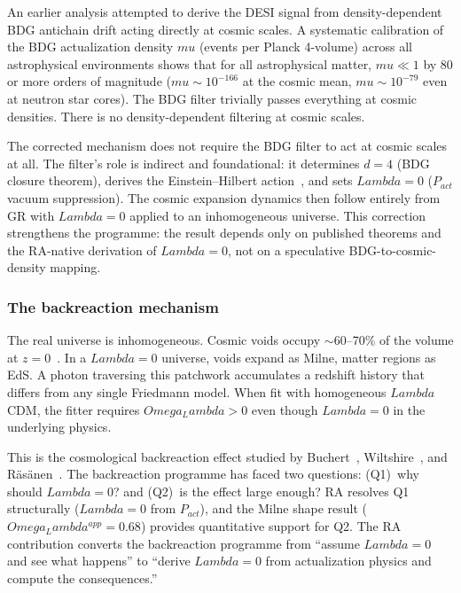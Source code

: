 \documentclass[11pt]{article}
\def\Lambda{Lambda}%
\def\Omega{Omega}%
\def\mu{mu}%
\def\mathrm#1{#1}%
\begin{document}
An earlier analysis attempted to derive the DESI signal from density-dependent BDG antichain drift acting directly at cosmic scales. A systematic calibration of the BDG actualization density $\mu$ (events per Planck 4-volume) across all astrophysical environments shows that for all astrophysical matter, $\mu\ll 1$ by $80$ or more orders of magnitude ($\mu\sim 10^{-166}$ at the cosmic mean, $\mu\sim 10^{-79}$ even at neutron star cores). The BDG filter trivially passes everything at cosmic densities. There is no density-dependent filtering at cosmic scales.

The corrected mechanism does not require the BDG filter to act at cosmic scales at all. The filter's role is indirect and foundational: it determines $d=4$ (BDG closure theorem), derives the Einstein--Hilbert action~\cite{Benincasa2010}, and sets $\Lambda=0$ ($P_{\mathrm{act}}$ vacuum suppression). The cosmic expansion dynamics then follow entirely from GR with $\Lambda=0$ applied to an inhomogeneous universe. This correction strengthens the programme: the result depends only on published theorems and the RA-native derivation of $\Lambda=0$, not on a speculative BDG-to-cosmic-density mapping.

\subsubsection{The backreaction mechanism}

The real universe is inhomogeneous. Cosmic voids occupy $\sim$60--70\% of the volume at $z=0$~\cite{Pan2012,Cautun2014}. In a $\Lambda=0$ universe, voids expand as Milne, matter regions as EdS. A photon traversing this patchwork accumulates a redshift history that differs from any single Friedmann model. When fit with homogeneous $\Lambda$CDM, the fitter requires $\Omega_\Lambda>0$ even though $\Lambda=0$ in the underlying physics.

This is the cosmological backreaction effect studied by Buchert~\cite{Buchert2000}, Wiltshire~\cite{Wiltshire2007}, and R\"as\"anen~\cite{Rasanen2004}. The backreaction programme has faced two questions: (Q1)~why should $\Lambda=0$? and (Q2)~is the effect large enough? RA resolves Q1 structurally ($\Lambda=0$ from $P_{\mathrm{act}}$), and the Milne shape result ($\Omega_\Lambda^{\mathrm{app}}=0.68$) provides quantitative support for Q2. The RA contribution converts the backreaction programme from ``assume $\Lambda=0$ and see what happens'' to ``derive $\Lambda=0$ from actualization physics and compute the consequences.''
\end{document}
